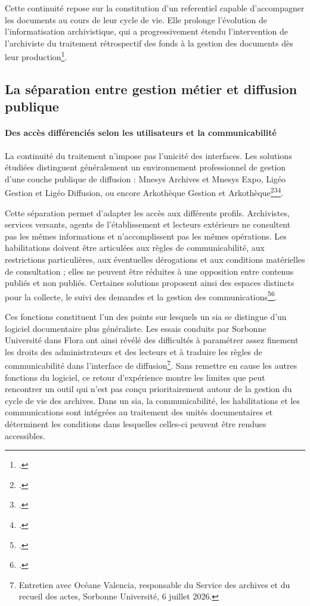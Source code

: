 Cette continuité repose sur la constitution d'un \gls{referentiel} capable d'accompagner les documents au cours de leur cycle de vie. Elle prolonge l'évolution de l'informatisation archivistique, qui a progressivement étendu l'intervention de l'archiviste du traitement rétrospectif des fonds à la gestion des documents dès leur production\footcite{Hamard2020}.


\subsection{La séparation entre gestion métier et diffusion publique}

\paragraph{Des accès différenciés selon les utilisateurs et la communicabilité}

La continuité du traitement n'impose pas l'unicité des interfaces. Les solutions étudiées distinguent généralement un environnement professionnel de gestion d'une couche publique de diffusion : Mnesys Archives et Mnesys Expo, Ligéo Gestion et Ligéo Diffusion, ou encore Arkothèque Gestion et Arkothèque\footcite{MnesysLogiciels}\footcite{LigeoPresentation}\footcite{ArkothequePresentation}.

Cette séparation permet d'adapter les accès aux différents profils. Archivistes, services versants, agents de l'établissement et lecteurs extérieurs ne consultent pas les mêmes informations et n'accomplissent pas les mêmes opérations. Les habilitations doivent être articulées aux règles de communicabilité, aux restrictions particulières, aux éventuelles dérogations et aux conditions matérielles de consultation ; elles ne peuvent être réduites à une opposition entre contenus publiés et non publiés. Certaines solutions proposent ainsi des espaces distincts pour la collecte, le suivi des demandes et la gestion des communications\footcite{ArkothequeCollecte}\footcite{ArkothequeCommunication}.

Ces fonctions constituent l'un des points sur lesquels un \gls{sia} se distingue d'un logiciel documentaire plus généraliste. Les essais conduits par Sorbonne Université dans Flora ont ainsi révélé des difficultés à paramétrer assez finement les droits des administrateurs et des lecteurs et à traduire les règles de communicabilité dans l'interface de diffusion\footnote{Entretien avec Océane Valencia, responsable du Service des archives et du recueil des actes, Sorbonne Université, 6 juillet 2026.}. Sans remettre en cause les autres fonctions du logiciel, ce retour d'expérience montre les limites que peut rencontrer un outil qui n'est pas conçu prioritairement autour de la gestion du cycle de vie des archives. Dans un \gls{sia}, la communicabilité, les habilitations et les communications sont intégrées au traitement des unités documentaires et déterminent les conditions dans lesquelles celles-ci peuvent être rendues accessibles.

